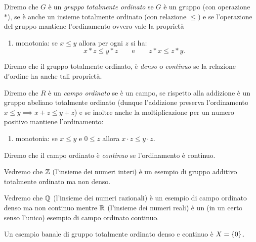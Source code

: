 \begin{definition}
  \label{def:gruppo_ordinato}%
  \label{def:campo_ordinato}%
  Diremo che $G$ è un \emph{gruppo totalmente ordinato}
%
% 
  se $G$ è un gruppo
  (con operazione $*$),
  se è anche un insieme totalmente ordinato (con relazione $\le$)
  e se l'operazione del gruppo mantiene 
  l'ordinamento ovvero vale la proprietà
  \begin{enumerate}
    \item[1.] monotonia:
    se $x\le y$ allora per ogni $z$ si ha:
      \[
      x*z \le y*z \qquad\text{e}\qquad z*x \le z*y.
      \] 
  \end{enumerate}
  Diremo che il gruppo totalmente ordinato, 
  è \emph{denso} o \emph{continuo} se la relazione 
  d'ordine ha anche tali proprietà.

  Diremo che $R$ è un \emph{campo ordinato}
%
%
  se è un campo, 
  se rispetto alla addizione 
  è un gruppo abeliano totalmente ordinato
  (dunque l'addizione preserva l'ordinamento 
  $x\le y \implies x+z\le y+z$)
  e se inoltre anche la moltiplicazione per un numero positivo 
  mantiene l'ordinamento:
  \begin{enumerate}
    \item[2.] monotonia: 
    se $x\le y$ e $0\le z$ allora $x\cdot z \le y\cdot z$. 
  \end{enumerate} 

  Diremo che il campo ordinato è \emph{continuo} 
  se l'ordinamento è continuo.
\end{definition}

\begin{example}
Vedremo che ${\mathbb Z}$ (l'insieme dei numeri interi) è un esempio di gruppo additivo totalmente ordinato 
ma non denso.
\end{example}

\begin{example}
Vedremo che ${\mathbb Q}$ (l'insieme dei numeri razionali) è un esempio di campo ordinato denso ma non continuo 
mentre ${\mathbb R}$ (l'insieme dei numeri reali) è un (in un certo senso l'unico) esempio di campo ordinato continuo.
\end{example}

\begin{example}
Un esempio banale di gruppo totalmente ordinato denso e continuo è $X={\left\{ 0 \right\}}$.
\end{example}

